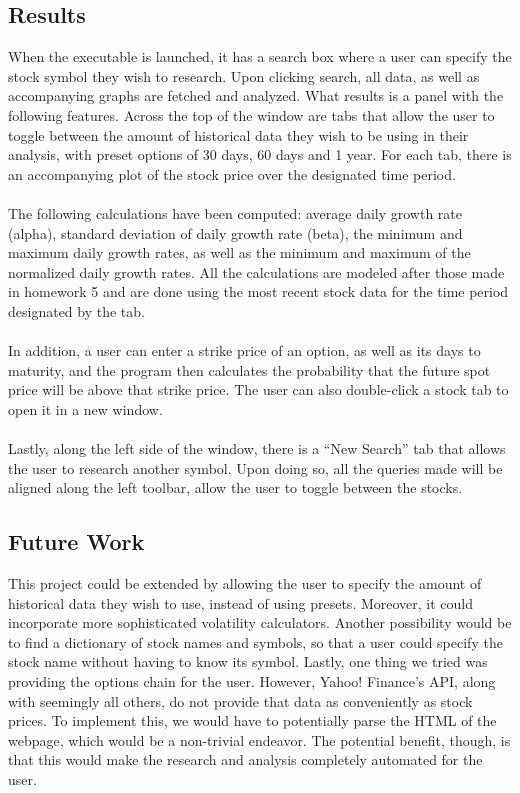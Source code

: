 \documentclass[pdftex,12pt]{article}
\theoremstyle{definition}
\theoremstyle{remark}
\begin{document}
\subsection*{Results}
When the executable is launched, it has a search box where a user can specify the stock symbol they wish to research. Upon clicking search, all data, as well as accompanying graphs are fetched and analyzed. What results is a panel with the following features. Across the top of the window are tabs that allow the user to toggle between the amount of historical data they wish to be using in their analysis, with preset options of 30 days, 60 days and 1 year. For each tab, there is an accompanying plot of the stock price over the designated time period. \\ \\
The following calculations have been computed: average daily growth rate (alpha), standard deviation of daily growth rate (beta), the minimum and maximum daily growth rates, as well as the minimum and maximum of the normalized daily growth rates. All the calculations are modeled after those made in homework 5 and are done using the most recent stock data for the time period designated by the tab.\\ \\
In addition, a user can enter a strike price of an option, as well as its days to maturity, and the program then calculates the probability that the future spot price will be above that strike price. The user can also double-click a stock tab to open it in a new window.\\ \\
Lastly, along the left side of the window, there is a ``New Search'' tab that allows the user to research another symbol. Upon doing so, all the queries made will be aligned along the left toolbar, allow the user to toggle between the stocks.
\subsection*{Future Work}
This project could be extended by allowing the user to specify the amount of historical data they wish to use, instead of using presets. Moreover, it could incorporate more sophisticated volatility calculators. Another possibility would be to find a dictionary of stock names and symbols, so that a user could specify the stock name without having to know its symbol. Lastly, one thing we tried was providing the options chain for the user. However, Yahoo! Finance's API, along with seemingly all others, do not provide that data as conveniently as stock prices. To implement this, we would have to potentially parse the HTML of the webpage, which would be a non-trivial endeavor. The potential benefit, though, is that this would make the research and analysis completely automated for the user.
\end{document}
